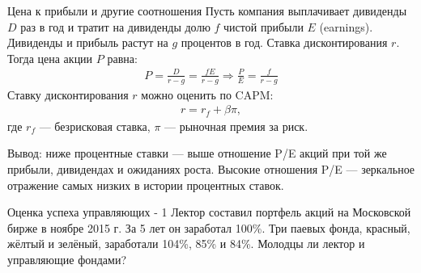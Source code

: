 \documentclass{beamer}
\begin{document}
\begin{frame}{Цена к прибыли и другие соотношения}
\justify
Пусть компания выплачивает дивиденды $D$ раз в год и тратит на дивиденды долю $f$ чистой прибыли $E$ (earnings). Дивиденды и прибыль растут на $g$ процентов в год. Ставка дисконтирования $r$. Тогда цена акции $P$ равна:
\begin{align*}
P = \frac{D}{r -g} = \frac{fE}{r-g} \Rightarrow \frac{P}{E} = \frac{f}{r -g}
\end{align*}
Ставку дисконтирования $r$ можно оценить по CAPM:
\begin{align*}
r = r_f + \beta\pi,
\end{align*}
где $r_f$ --- безрисковая ставка, $\pi$ --- рыночная премия за риск.

\justify
Вывод: ниже процентные ставки --- выше отношение P/E акций при той же прибыли, дивидендах и ожиданиях роста. Высокие отношения P/E --- зеркальное отражение самых низких в истории процентных ставок.
\end{frame}



\begin{frame}{Оценка успеха управляющих - 1}
\justify
Лектор составил портфель акций на Московской бирже в ноябре 2015 г. За 5 лет он заработал 100\%. Три паевых фонда, красный, жёлтый и зелёный, заработали 104\%, 85\% и 84\%. Молодцы ли лектор и управляющие фондами?

\vspace{\baselineskip}
\end{frame}
\end{document}
